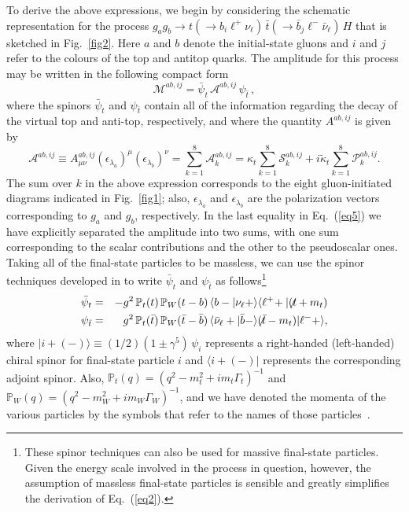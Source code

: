 \documentclass[aps,preprint,tightenlines,floatfix,superscriptaddress,nofootinbib,showpacs]{revtex4-1}
\def\beq{\begin{equation}}
\def\eeq{\end{equation}}
\def\bea{\begin{eqnarray}}
\def\eea{\end{eqnarray}}
\def\tbslash{\tbar\hspace{-10pt}\not{}\hspace{4pt}}
\def\tslash{t\hspace{-10pt}\not{}\hspace{4pt}}
\def\tbar{\bar{t}}
\def\bbar{\bar{b}}
\def\nubar{{\bar{\nu}}_{\ell}}
\def\kp{\kappa_t}
\def\kpt{\tilde{\kappa}_t}
\providecommand{\DIFadd}[1]{{\protect\color{blue}\uwave{#1}}} %
\providecommand{\DIFaddbegin}{} %
\providecommand{\DIFaddend}{} %
\begin{document}
To derive the above expressions, we begin by considering the
schematic representation for the process $g_ag_b\to t(\to
b_i{\ell}^+\nu_{\ell})\,\tbar(\to \bbar_j {\ell}^- \nubar)\,H$
that is sketched in Fig.~\ref{fig2}.
Here $a$ and $b$ denote the initial-state gluons and
$i$ and $j$ refer to the colours of the top and antitop quarks.
%
The amplitude for this process may be written in the following
compact form
%
\beq
\label{eq6}
\mathcal{M}^{ab,ij}=\bar{\psi}_t\,\mathcal{A}^{ab,ij}\,\psi_{\tbar}\,,
\eeq
%
where the spinors $\bar{\psi}_t$ and $\psi_{\tbar}$
contain all of the information regarding the decay of the
virtual top and anti-top, respectively,
and where the quantity $A^{ab,ij}$ is given by
%
\beq
\label{eq5}
\mathcal{A}^{ab,ij}\equiv A^{ab,ij}_{\mu\nu}(\epsilon_{\lambda_a})^{\mu}(\epsilon_{\lambda_b})^{\nu}=\sum_{k=1}^8 \mathcal{A}^{ab,ij}_k =\kp \sum_{k=1}^8 \mathcal{S}^{ab,ij}_k + i\kpt \sum_{k=1}^8 \mathcal{P}^{ab,ij}_k.
\eeq 
%
The sum over $k$ in the above expression
corresponds to the eight gluon-initiated
diagrams indicated in Fig.~\ref{fig1}; also,
$\epsilon_{\lambda_a}$ and $\epsilon_{\lambda_b}$ are the
polarization vectors corresponding to $g_a$ and $g_b$, respectively.
In the last equality in Eq.~(\ref{eq5})
we have explicitly separated the amplitude into
two sums, with one sum corresponding to the scalar contributions
and the other to the pseudoscalar ones.
Taking all of the final-state particles to be massless, we can use the
spinor techniques
developed in \DIFaddbegin \DIFadd{Ref.~}\DIFaddend \cite{Kleiss} to write $\bar{\psi}_t$ and
$\psi_{\tbar}$ as follows\footnote{These spinor techniques can also be used
  for massive final-state particles. Given the
  energy scale involved in the process in question, however, the assumption
  of massless final-state particles is sensible and greatly
  simplifies the derivation of Eq.~(\ref{eq2}).}
%
\bea
\label{eq7}
\bar{\psi}_t &=& -g^2\, \mathbb{P}_t(t)\,\mathbb{P}_W(t-b)\,
   \langle b-|\nu_{\ell}+\rangle \langle {\ell}^+\!+|(\tslash+m_t)\\
\label{eq8}
\psi_{\tbar} &=& g^2\, \mathbb{P}_t(\tbar)\,\mathbb{P}_W(\tbar-\bbar)\,
   \langle\nubar+|\bbar-\rangle (\tbslash-m_t)|{\ell}^-+\rangle,
\eea
%
where $|i+(-)\rangle \equiv (1/2)(1\pm \gamma^5)\,\psi_i$
represents a right-handed (left-handed) chiral spinor for final-state
particle $i$ and $\langle i+(-)|$ represents the corresponding adjoint spinor.
Also, $\mathbb{P}_t(q)=(q^2-m^2_t+im_t\Gamma_t)^{-1}$ and
$\mathbb{P}_W(q)=(q^2-m^2_W+im_W\Gamma_W)^{-1}$, and
we have denoted the momenta of the various particles by the symbols
that refer to the names of those particles~\cite{Mangano}.
\end{document}
